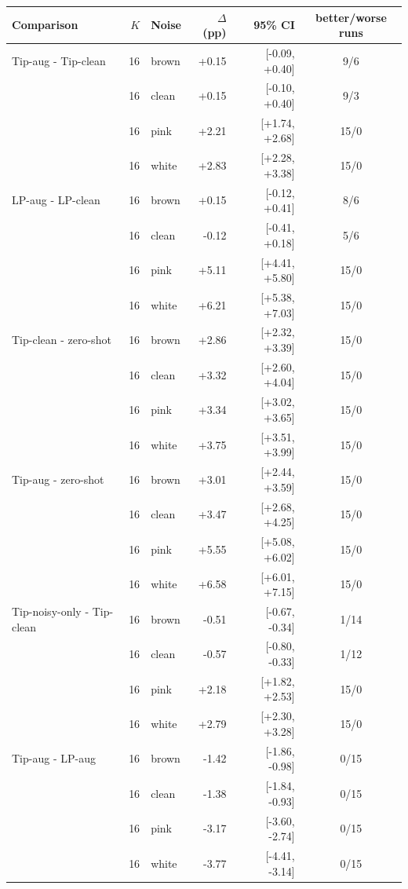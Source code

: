 \begin{tabular}{lrlrrc}
\toprule
Comparison & $K$ & Noise & $\Delta$ (pp) & 95\% CI & better/worse runs \\
\midrule
Tip-aug - Tip-clean & 16 & brown & +0.15 & [-0.09, +0.40] & 9/6 \\
 & 16 & clean & +0.15 & [-0.10, +0.40] & 9/3 \\
 & 16 & pink & +2.21 & [+1.74, +2.68] & 15/0 \\
 & 16 & white & +2.83 & [+2.28, +3.38] & 15/0 \\
\midrule
LP-aug - LP-clean & 16 & brown & +0.15 & [-0.12, +0.41] & 8/6 \\
 & 16 & clean & -0.12 & [-0.41, +0.18] & 5/6 \\
 & 16 & pink & +5.11 & [+4.41, +5.80] & 15/0 \\
 & 16 & white & +6.21 & [+5.38, +7.03] & 15/0 \\
\midrule
Tip-clean - zero-shot & 16 & brown & +2.86 & [+2.32, +3.39] & 15/0 \\
 & 16 & clean & +3.32 & [+2.60, +4.04] & 15/0 \\
 & 16 & pink & +3.34 & [+3.02, +3.65] & 15/0 \\
 & 16 & white & +3.75 & [+3.51, +3.99] & 15/0 \\
\midrule
Tip-aug - zero-shot & 16 & brown & +3.01 & [+2.44, +3.59] & 15/0 \\
 & 16 & clean & +3.47 & [+2.68, +4.25] & 15/0 \\
 & 16 & pink & +5.55 & [+5.08, +6.02] & 15/0 \\
 & 16 & white & +6.58 & [+6.01, +7.15] & 15/0 \\
\midrule
Tip-noisy-only - Tip-clean & 16 & brown & -0.51 & [-0.67, -0.34] & 1/14 \\
 & 16 & clean & -0.57 & [-0.80, -0.33] & 1/12 \\
 & 16 & pink & +2.18 & [+1.82, +2.53] & 15/0 \\
 & 16 & white & +2.79 & [+2.30, +3.28] & 15/0 \\
\midrule
Tip-aug - LP-aug & 16 & brown & -1.42 & [-1.86, -0.98] & 0/15 \\
 & 16 & clean & -1.38 & [-1.84, -0.93] & 0/15 \\
 & 16 & pink & -3.17 & [-3.60, -2.74] & 0/15 \\
 & 16 & white & -3.77 & [-4.41, -3.14] & 0/15 \\
\bottomrule
\end{tabular}
